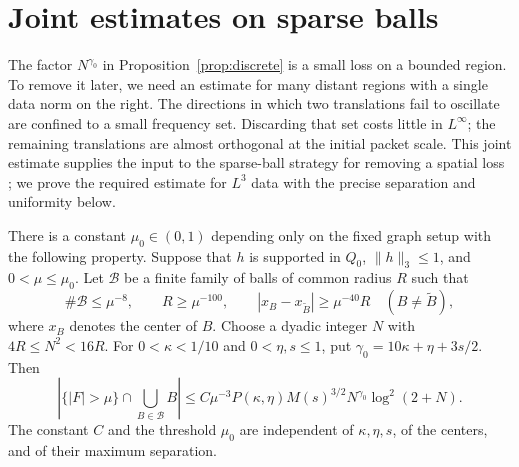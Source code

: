 \section{Joint estimates on sparse balls}\label{sec:sparse}

The factor $N^{\gamma_0}$ in Proposition~\ref{prop:discrete} is a
small loss on a bounded region.  To remove it later, we need an estimate
for many distant regions with a single data norm on the right.  The
directions in which two translations fail to oscillate are confined to
a small frequency set.  Discarding that set costs little in $L^\infty$;
the remaining translations are almost orthogonal at the initial packet
scale. This joint estimate supplies the input to the sparse-ball
strategy for removing a spatial loss \cite{Tao1999Epsilon,BourgainGuth2011,Kim2017};
we prove the required estimate for \(L^3\) data with the precise
separation and uniformity below.

\begin{proposition}\label{prop:sparse}
There is a constant $\mu_0\in(0,1)$ depending only on the fixed graph
setup with the following property.  Suppose that $h$ is supported in
$Q_0$, $\|h\|_3\leq1$, and $0<\mu\leq\mu_0$.  Let $\mathcal B$ be a
finite family of balls of common radius $R$ such that
\[
 \#\mathcal B\leq\mu^{-8},\qquad R\geq\mu^{-100},\qquad
 |x_B-x_{\widetilde B}|\geq\mu^{-40}R
 \quad(B\ne\widetilde B),
\]
where $x_B$ denotes the center of $B$.  Choose a dyadic integer $N$ with
$4R\leq N^2<16R$.  For $0<\kappa<1/10$ and $0<\eta,s\leq1$, put
$\gamma_0=10\kappa+\eta+3s/2$.  Then
\begin{equation}\label{eq:sparse-estimate}
 \left|\{|F|>\mu\}\cap\bigcup_{B\in\mathcal B}B\right|
 \leq C\mu^{-3}P(\kappa,\eta)M(s)^{3/2}
       N^{\gamma_0}\log^2(2+N).
\end{equation}
The constant $C$ and the threshold $\mu_0$ are independent of
$\kappa,\eta,s$, of the centers, and of their maximum separation.
\end{proposition}

